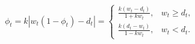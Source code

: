\documentclass[11pt,border=2pt]{standalone}
\begin{document}
{\color{mathblue}$\displaystyle \phi_t=k\left|w_t(1-\phi_t)-d_t\right|=\begin{cases}\displaystyle\frac{k(w_t-d_t)}{1+kw_t},&w_t\geq d_t,\\[5pt]\displaystyle\frac{k(d_t-w_t)}{1-kw_t},&w_t<d_t.\end{cases}$}
\end{document}
